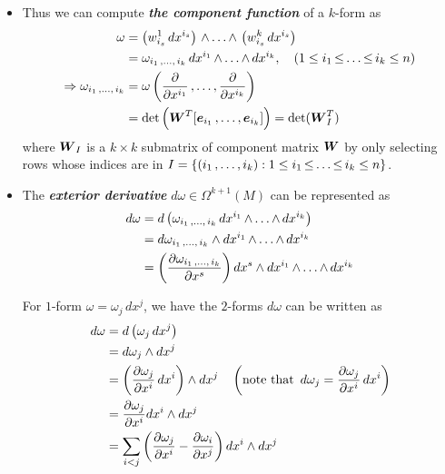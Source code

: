 \documentclass[11pt]{article}
\begin{document}
\begin{itemize}
\item Thus we can compute \emph{\textbf{the component function}} of a $k$-form as
\begin{align*}
\omega &=\left(w_{i_s}^{1}\,dx^{i_s}\right) \,{\wedge}\ldots{\wedge}\, \left(w_{i_s}^{k}\,dx^{i_s}\right) \nonumber\\
&= \omega_{i_1 \,{,}\ldots{,}\, i_k}\,dx^{i_1} \,{\wedge}\ldots{\wedge}\, dx^{i_k}, \quad (1\le i_1 \,{\le}\ldots{\le}\, i_k \le n) \nonumber\\
\Rightarrow \omega_{i_1 \,{,}\ldots{,}\, i_k}&= \omega\left(\frac{\partial }{ \partial x^{i_1}} \,{,}\ldots{,}\, \frac{\partial }{ \partial x^{i_k}}\right) \nonumber\\
&= \det\left(\boldsymbol{W}^{T}[\boldsymbol{e}_{i_1} \,{,}\ldots{,}\, \boldsymbol{e}_{i_k}]\right) = \det(\boldsymbol{W}_{I}^{T})
\end{align*} where $\boldsymbol{W}_{I}$ is a $k\times k$ submatrix of component matrix $\boldsymbol{W}$ by only selecting rows whose indices are in $I = \{(i_1 \,{,}\ldots{,}\, i_k): 1\le i_1 \,{\le}\ldots{\le}\, i_k \le n\}$.

\item The \emph{\textbf{exterior derivative}} $d\omega \in \Omega^{k+1}(M)$ can be represented as
\begin{align}
d\omega &= d\left(\omega_{i_1 \,{,}\ldots{,}\, i_k}\, dx^{i_1} \,{\wedge}\ldots{\wedge}\, dx^{i_k}\right) \nonumber\\
&= d \omega_{i_1 \,{,}\ldots{,}\, i_k} \wedge  dx^{i_1} \,{\wedge}\ldots{\wedge}\, dx^{i_k} \nonumber\\
&= \left(\frac{\partial \omega_{i_1 \,{,}\ldots{,}\, i_k}}{ \partial x^s}\right) dx^s  \wedge  dx^{i_1} \,{\wedge}\ldots{\wedge}\, dx^{i_k}  \label{eqn: differential_k_form_ext_derivative}
\end{align}

For $1$-form $\omega = \omega_j\,dx^j$, we have the $2$-forms $d\omega$ can be written as
\begin{align}
d\omega &=d\left(\omega_j\,dx^j\right) \nonumber\\
&= d\omega_j \wedge dx^j  \nonumber\\ 
&= \left(\frac{\partial \omega_j}{ \partial x^i}\,dx^i\right) \wedge dx^j \quad \left(\text{note that } \, d\omega_j= \frac{\partial \omega_j}{ \partial x^i}\,dx^i\right) \nonumber\\
&=\frac{\partial \omega_j}{ \partial x^i}dx^i \wedge dx^j \nonumber\\
&=\sum_{i < j}\left(\frac{\partial \omega_j}{ \partial x^i} - \frac{\partial \omega_i}{ \partial x^j}\right)dx^i \wedge dx^j  \label{eqn: eqn: differential_1_form_ext_derivative}
\end{align}


\end{itemize}
\end{document}
